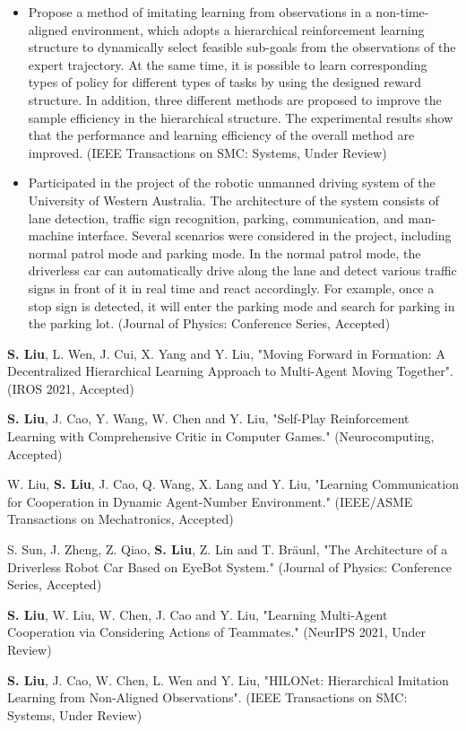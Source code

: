 {\begin{itemize}
    \item Propose a method of imitating learning from observations in a non-time-aligned environment, which adopts a hierarchical reinforcement learning structure to dynamically select feasible sub-goals from the observations of the expert trajectory. At the same time, it is possible to learn corresponding types of policy for different types of tasks by using the designed reward structure. In addition, three different methods are proposed to improve the sample efficiency in the hierarchical structure. The experimental results show that the performance and learning efficiency of the overall method are improved. (IEEE Transactions on SMC: Systems, Under Review)
  \end{itemize}
}

{\small
  \begin{itemize}
    \item Participated in the project of the robotic unmanned driving system of the University of Western Australia. The architecture of the system consists of lane detection, traffic sign recognition, parking, communication, and man-machine interface. Several scenarios were considered in the project, including normal patrol mode and parking mode. In the normal patrol mode, the driverless car can automatically drive along the lane and detect various traffic signs in front of it in real time and react accordingly. For example, once a stop sign is detected, it will enter the parking mode and search for parking in the parking lot. (Journal of Physics: Conference Series, Accepted)
  \end{itemize}
}


\begin{itemize}[leftmargin=*]
  {\small
  \item
  \textbf{S. Liu}, L. Wen, J. Cui, X. Yang and Y. Liu, "Moving Forward in Formation: A Decentralized Hierarchical Learning Approach to Multi-Agent Moving Together". (IROS 2021, Accepted)
  \item
  \textbf{S. Liu}, J. Cao, Y. Wang, W. Chen and Y. Liu, "Self-Play Reinforcement Learning with Comprehensive Critic in Computer Games." (Neurocomputing, Accepted)
  \item
  W. Liu, \textbf{S. Liu}, J. Cao, Q. Wang, X. Lang and Y. Liu, "Learning Communication for Cooperation in Dynamic Agent-Number Environment." (IEEE/ASME Transactions on Mechatronics, Accepted)
  \item 
  S. Sun, J. Zheng, Z. Qiao, \textbf{S. Liu}, Z. Lin and T. Bräunl, "The Architecture of a Driverless Robot Car Based on EyeBot System." (Journal of Physics: Conference Series, Accepted)
  \item
  \textbf{S. Liu}, W. Liu, W. Chen, J. Cao and Y. Liu, "Learning Multi-Agent Cooperation via Considering Actions of Teammates." (NeurIPS 2021, Under Review)
  \item
  \textbf{S. Liu}, J. Cao, W. Chen, L. Wen and Y. Liu, "HILONet: Hierarchical Imitation Learning from Non-Aligned Observations". (IEEE Transactions on SMC: Systems, Under Review)}

\end{itemize}
